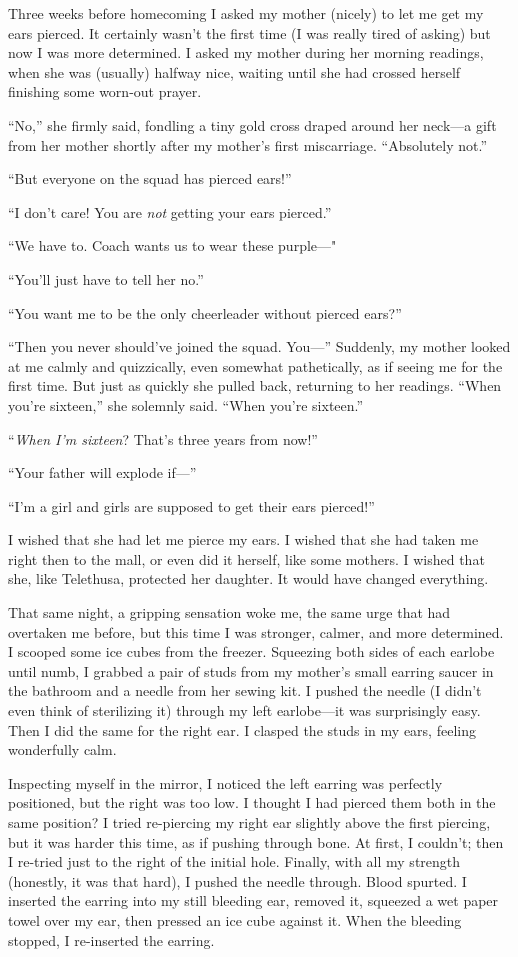 Three weeks before homecoming I asked my mother (nicely) to let me get
my ears pierced. It certainly wasn't the first time (I was really tired
of asking) but now I was more determined. I asked my mother during her
morning readings, when she was (usually) halfway nice, waiting until she
had crossed herself finishing some worn-out prayer.

``No,'' she firmly said, fondling a tiny gold cross draped around her
neck---a gift from her mother shortly after my mother's first
miscarriage. ``Absolutely not.''

``But everyone on the squad has pierced ears!''

``I don't care! You are \emph{not} getting your ears pierced.''

``We have to. Coach wants us to wear these purple---"

``You'll just have to tell her no.''

``You want me to be the only cheerleader without pierced ears?''

``Then you never should've joined the squad. You---'' Suddenly, my
mother looked at me calmly and quizzically, even somewhat pathetically,
as if seeing me for the first time. But just as quickly she pulled back,
returning to her readings. ``When you're sixteen,'' she solemnly said.
``When you're sixteen.''

``\emph{When I'm sixteen}? That's three years from now!''

``Your father will explode if---''

``I'm a girl and girls are supposed to get their ears pierced!''

I wished that she had let me pierce my ears. I wished that she had taken
me right then to the mall, or even did it herself, like some mothers. I
wished that she, like Telethusa, protected her daughter. It would have
changed everything.

That same night, a gripping sensation woke me, the same urge that had
overtaken me before, but this time I was stronger, calmer, and more
determined. I scooped some ice cubes from the freezer. Squeezing both
sides of each earlobe until numb, I grabbed a pair of studs from my
mother's small earring saucer in the bathroom and a needle from her
sewing kit. I pushed the needle (I didn't even think of sterilizing it)
through my left earlobe---it was surprisingly easy. Then I did the same
for the right ear. I clasped the studs in my ears, feeling wonderfully
calm.

Inspecting myself in the mirror, I noticed the left earring was
perfectly positioned, but the right was too low. I thought I had pierced
them both in the same position? I tried re-piercing my right ear
slightly above the first piercing, but it was harder this time, as if
pushing through bone. At first, I couldn't; then I re-tried just to the
right of the initial hole. Finally, with all my strength (honestly, it
was that hard), I pushed the needle through. Blood spurted. I inserted
the earring into my still bleeding ear, removed it, squeezed a wet paper
towel over my ear, then pressed an ice cube against it. When the
bleeding stopped, I re-inserted the earring.

